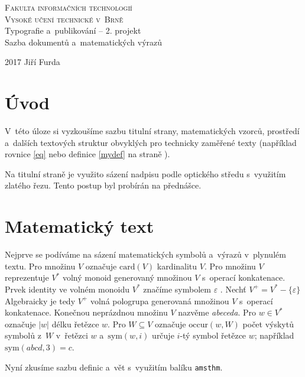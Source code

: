 \documentclass[11pt,a4paper,twocolumn]{article}
\begin{document}
\begin{titlepage}
	\begin{center}
		\linespread{0}
		\Huge
			\textsc{Fakulta informačních technologií \\
			Vysoké učení technické v~Brně}
			\\[84mm]
		\LARGE
			Typografie a~publikování -- 2. projekt \\
			Sazba dokumentů a~matematických výrazů
			\vfill
	\end{center}
	{\Large 2017 \hfill Jiří Furda}
\end{titlepage}

\label{page}

\section*{Úvod}
V~této úloze si vyzkoušíme sazbu titulní strany, matematických vzorců, prostředí a~dalších textových struktur obvyklých pro technicky zaměřené texty (například rovnice \eqref{eq} nebo definice \ref{mydef} na straně \pageref{page}).

Na titulní straně je využito sázení nadpisu podle op\-tic\-ké\-ho středu s~využitím zlatého řezu. Tento postup byl probírán na přednášce.


\section{Matematický text}

Nejprve se podíváme na sázení matematických symbolů a~výrazů v~plynulém textu. Pro množinu $V$ označuje $\mathrm{card}(V)$ kardinalitu $V$.
Pro množinu $V$ reprezentuje $V^*$ volný monoid generovaný množinou $V$ s~operací kon\-ka\-te\-na\-ce.
Prvek identity ve volném monoidu $V^*$ značíme symbolem $\varepsilon$ .
Nechť $V^+ = V^* - \{ \varepsilon \}$ Algebraicky je tedy $V^+$ volná pologrupa generovaná množinou $V$ s~operací konkatenace.
Konečnou neprázdnou množinu $V$ nazvěme \emph{abeceda}.
Pro $w \in V^* $ označuje $|w|$ délku řetězce $w$. Pro $W \subseteq V$ označuje $\mathrm{occur}(w,W)$ počet výskytů symbolů z~$W$ v~řetězci $w$ a~$\mathrm{sym}(w,i)$ určuje $i$-tý symbol řetězce $w$; například $\mathrm{sym}(abcd,3) = c$.

Nyní zkusíme sazbu definic a~vět s~využitím balíku \texttt{amsthm}.
\end{document}
